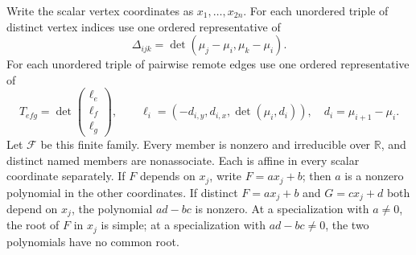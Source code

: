 \begin{lemma}
\label{lem:transport-polynomials}\leanok
Write the scalar vertex coordinates as $x_1,\ldots,x_{2n}$.
For each unordered triple of distinct vertex indices use one ordered
representative of
\begin{equation}\label{transport:delta}
 \Delta_{ijk}=\det(\mu_j-\mu_i,\mu_k-\mu_i).
\end{equation}
For each unordered triple of pairwise remote edges use one ordered
representative of
\begin{equation}\label{transport:T}
 T_{efg}=\det\begin{pmatrix}\ell_e\\\ell_f\\\ell_g\end{pmatrix},
 \qquad \ell_i=(-d_{i,y},d_{i,x},\det(\mu_i,d_i)),
 \quad d_i=\mu_{i+1}-\mu_i.
\end{equation}
Let $\mathcal F$ be this finite family. Every member is nonzero and
irreducible over $\mathbb R$, and distinct named members are nonassociate.
Each is affine in every scalar coordinate separately. If $F$ depends on
$x_j$, write $F=a x_j+b$; then $a$ is a nonzero polynomial in the other
coordinates. If distinct $F=a x_j+b$ and $G=c x_j+d$ both depend on $x_j$,
the polynomial $ad-bc$ is nonzero. At a specialization with $a\ne0$,
the root of $F$ in $x_j$ is simple; at a specialization with $ad-bc\ne0$,
the two polynomials have no common root.

\end{lemma}
